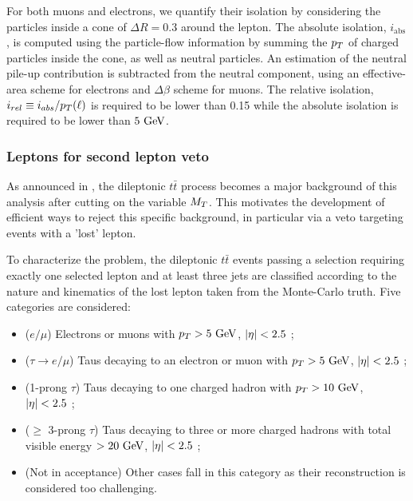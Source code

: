     For both muons and electrons, we quantify their isolation by considering the particles
    inside a cone of $\Delta R = 0.3$ around the lepton. The absolute isolation, $i_\text{abs}$,
    is computed using the particle-flow information by summing the $p_T$ of charged particles
    inside the cone, as well as neutral particles. An estimation of the neutral pile-up
    contribution is subtracted from the neutral component, using an effective-area scheme
    for electrons and $\Delta \beta$ scheme for muons. The relative isolation, $i_{rel}
    \equiv i_{abs} / p_T(\ell)$ is required
    to be lower than 0.15 while the absolute isolation is required to be lower than $5~\text{GeV}$.

        \subsubsection{Leptons for second lepton veto \label{sec:vetoLeptons}}

    As announced in , the dileptonic $t\bar{t}$
    process becomes a major background of this analysis after cutting on the variable $M_T$.
    This motivates the development of efficient ways to reject this specific background,
    in particular via a veto targeting events with a 'lost' lepton.

    To characterize the problem, the dileptonic $t\bar{t}$ events passing a selection
    requiring exactly one selected lepton and at least three jets are classified according
    to the nature and kinematics of the lost lepton taken from the Monte-Carlo truth. Five
    categories are considered:
    \begin{itemize}
        \item ($e/\mu$) Electrons or muons with $p_T > 5~\text{GeV}$, $\left| \eta \right| < 2.5$ ;
        \item ($\tau \rightarrow e/\mu$) Taus decaying to an electron or muon with $p_T > 5~\text{GeV}$, $\left| \eta \right| < 2.5$ ;
        \item (1-prong $\tau$) Taus decaying to one charged hadron with $p_T > 10~\text{GeV}$, $\left| \eta \right| < 2.5$ ;
        \item ($\geq$ 3-prong $\tau$) Taus decaying to three or more charged hadrons
              with total visible energy $> 20~\text{GeV}$, $\left| \eta \right| < 2.5$ ;
        \item (Not in acceptance) Other cases fall in this category as their reconstruction
              is considered too challenging.
    \end{itemize}

